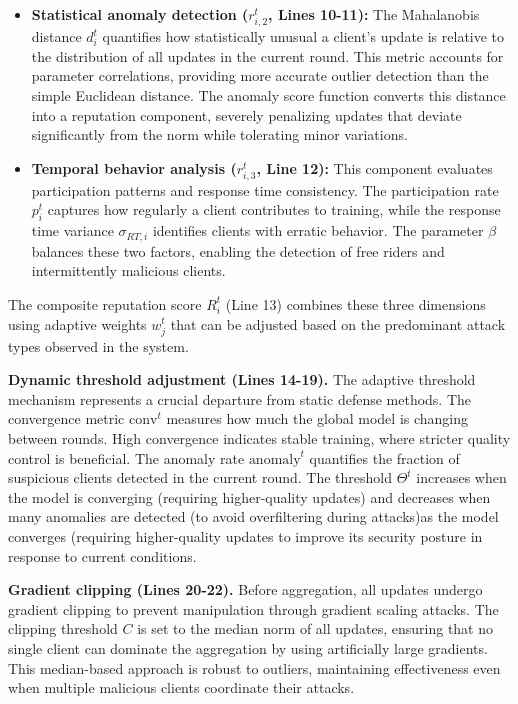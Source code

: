 \documentclass[lettersize,journal]{IEEEtran}
\begin{document}
{\begin{itemize}[wide]
   \item \textbf{Statistical anomaly detection ($r_{i,2}^t$, Lines 10-11):} The Mahalanobis distance $d_i^t$ quantifies how statistically unusual a client's update is relative to the distribution of all updates in the current round. This metric accounts for parameter correlations, providing more accurate outlier detection than the simple Euclidean distance. The anomaly score function converts this distance into a reputation component, severely penalizing updates that deviate significantly from the norm while tolerating minor variations.
   
   \item \textbf{Temporal behavior analysis ($r_{i,3}^t$, Line 12):} This component evaluates participation patterns and response time consistency. The participation rate $p_i^t$ captures how regularly a client contributes to training, while the response time variance $\sigma_{RT,i}$ identifies clients with erratic behavior. The parameter $\beta$ balances these two factors, enabling the detection of free riders and intermittently malicious clients.
\end{itemize}
The composite reputation score $R_i^t$ (Line 13) combines these three dimensions using adaptive weights $w_j^t$ that can be adjusted based on the predominant attack types observed in the system.

\textbf{Dynamic threshold adjustment (Lines 14-19).} The adaptive threshold mechanism represents a crucial departure from static defense methods. The convergence metric $\text{conv}^t$ measures how much the global model is changing between rounds. High convergence indicates stable training, where stricter quality control is beneficial. The anomaly rate $\text{anomaly}^t$ quantifies the fraction of suspicious clients detected in the current round. The threshold $\Theta^t$ increases when the model is converging (requiring higher-quality updates) and decreases when many anomalies are detected (to avoid overfiltering during attacks)as the model converges (requiring higher-quality updates to improve its security posture in response to current conditions.

\textbf{Gradient clipping (Lines 20-22).} Before aggregation, all updates undergo gradient clipping to prevent manipulation through gradient scaling attacks. The clipping threshold $C$ is set to the median norm of all updates, ensuring that no single client can dominate the aggregation by using artificially large gradients. This median-based approach is robust to outliers, maintaining effectiveness even when multiple malicious clients coordinate their attacks.

}
\end{document}
